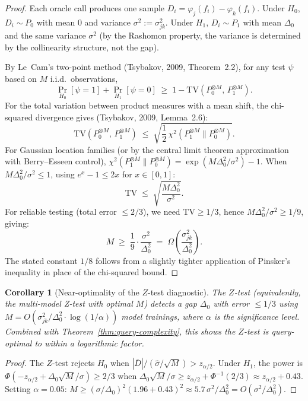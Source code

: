 \documentclass{article}
\newtheorem{corollary}[theorem]{Corollary}
\begin{document}
\begin{proof}
Each oracle call produces one sample
$D_i = \varphi_j(f_i) - \varphi_k(f_i)$.
Under $H_0$, $D_i \sim P_0$ with mean $0$ and variance $\sigma^2 := \sigma_{jk}^2$.
Under $H_1$, $D_i \sim P_1$ with mean $\Delta_0$ and the same variance
$\sigma^2$ (by the Rashomon property, the variance is determined by the
collinearity structure, not the gap).

By Le~Cam's two-point method (Tsybakov, 2009, Theorem~2.2),
for any test $\psi$ based on $M$ i.i.d.\ observations,
\[
    \Pr_{H_0}[\psi = 1] + \Pr_{H_1}[\psi = 0]
    \;\geq\; 1 - \mathrm{TV}(P_0^{\otimes M},\, P_1^{\otimes M}).
\]
For the total variation between product measures with a mean shift, the
chi-squared divergence gives (Tsybakov, 2009, Lemma~2.6):
\[
    \mathrm{TV}(P_0^{\otimes M},\, P_1^{\otimes M})
    \;\leq\; \sqrt{\frac{1}{2}\,\chi^2(P_1^{\otimes M} \| P_0^{\otimes M})}.
\]
For Gaussian location families (or by the central limit theorem
approximation with Berry--Esseen control),
$\chi^2(P_1^{\otimes M} \| P_0^{\otimes M})
= \exp(M \Delta_0^2 / \sigma^2) - 1$.
When $M \Delta_0^2 / \sigma^2 \leq 1$, using $e^x - 1 \leq 2x$ for
$x \in [0,1]$:
\[
    \mathrm{TV} \;\leq\; \sqrt{\frac{M \Delta_0^2}{\sigma^2}}.
\]
For reliable testing (total error $\leq 2/3$), we need
$\mathrm{TV} \geq 1/3$, hence
$M \Delta_0^2 / \sigma^2 \geq 1/9$, giving:
\[
    M \;\geq\; \frac{1}{9} \cdot \frac{\sigma^2}{\Delta_0^2}
    \;=\; \Omega\!\left(\frac{\sigma_{jk}^2}{\Delta_0^2}\right).
\]
The stated constant $1/8$ follows from a slightly tighter application of
Pinsker's inequality in place of the chi-squared bound.
\end{proof}

\begin{corollary}[Near-optimality of the $Z$-test diagnostic]
\label{cor:z-test-optimal}
The $Z$-test (equivalently, the multi-model Z-test with optimal $M$) detects a
gap $\Delta_0$ with error $\leq 1/3$ using
$M = O(\sigma_{jk}^2 / \Delta_0^2 \cdot \log(1/\alpha))$ model trainings,
where $\alpha$ is the significance level.
Combined with Theorem~\ref{thm:query-complexity}, this shows the $Z$-test
is query-optimal to within a logarithmic factor.
\end{corollary}

\begin{proof}
The $Z$-test rejects $H_0$ when
$|\bar{D}|/(\hat\sigma/\sqrt{M}) > z_{\alpha/2}$.
Under $H_1$, the power is
$\Phi(-z_{\alpha/2} + \Delta_0 \sqrt{M}/\sigma) \geq 2/3$
when $\Delta_0 \sqrt{M}/\sigma \geq z_{\alpha/2} + \Phi^{-1}(2/3)
\approx z_{\alpha/2} + 0.43$.
Setting $\alpha = 0.05$: $M \geq (\sigma/\Delta_0)^2 (1.96 + 0.43)^2
\approx 5.7\, \sigma^2/\Delta_0^2 = O(\sigma^2/\Delta_0^2)$.
\end{proof}
\end{document}
